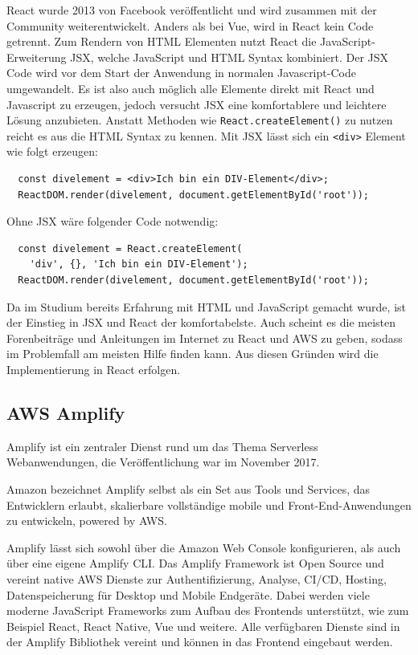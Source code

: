 {React wurde 2013 von Facebook veröffentlicht und wird zusammen mit der Community weiterentwickelt.
Anders als bei Vue, wird in React kein Code getrennt.
Zum Rendern von HTML Elementen nutzt React die JavaScript-Erweiterung JSX, welche JavaScript und HTML Syntax kombiniert.
Der JSX Code wird vor dem Start der Anwendung in normalen Javascript-Code umgewandelt.
Es ist also auch möglich alle Elemente direkt mit React und Javascript zu erzeugen, jedoch versucht JSX eine komfortablere und leichtere Lösung anzubieten.
Anstatt Methoden wie \verb+React.createElement()+ zu nutzen reicht es aus die HTML Syntax zu kennen.
Mit JSX lässt sich ein \verb+<div>+ Element wie folgt erzeugen:
\begin{verbatim}
  const divelement = <div>Ich bin ein DIV-Element</div>;
  ReactDOM.render(divelement, document.getElementById('root'));
\end{verbatim}

Ohne JSX wäre folgender Code notwendig:
\begin{verbatim}
  const divelement = React.createElement(
    'div', {}, 'Ich bin ein DIV-Element');
  ReactDOM.render(divelement, document.getElementById('root'));
\end{verbatim}
\cite[]{JSX}

Da im Studium bereits Erfahrung mit HTML und JavaScript gemacht wurde, ist der Einstieg in JSX und React der komfortabelste.
Auch scheint es die meisten Forenbeiträge und Anleitungen im Internet zu React und AWS zu geben, sodass im Problemfall am meisten Hilfe finden kann.
Aus diesen Gründen wird die Implementierung in React erfolgen.


\subsection{AWS Amplify}

Amplify ist ein zentraler Dienst rund um das Thema Serverless Webanwendungen, die Veröffentlichung war im November 2017.

Amazon bezeichnet Amplify selbst als {}\glqq ein Set aus Tools und Services, das Entwicklern erlaubt, skalierbare vollständige
mobile und Front-End-Anwendungen zu entwickeln, powered by AWS.\grqq{}\cite[]{AWSAmplify}

Amplify lässt sich sowohl über die Amazon Web Console konfigurieren, als auch über eine eigene Amplify CLI.
Das Amplify Framework ist Open Source und vereint native AWS Dienste zur Authentifizierung, Analyse, CI/CD, Hosting, Datenspeicherung für Desktop und Mobile
Endgeräte. Dabei werden viele moderne JavaScript Frameworks zum Aufbau des Frontends unterstützt, wie zum Beispiel React, React Native, Vue und weitere.
Alle verfügbaren Dienste sind in der Amplify Bibliothek vereint und können in das Frontend eingebaut werden.

}
